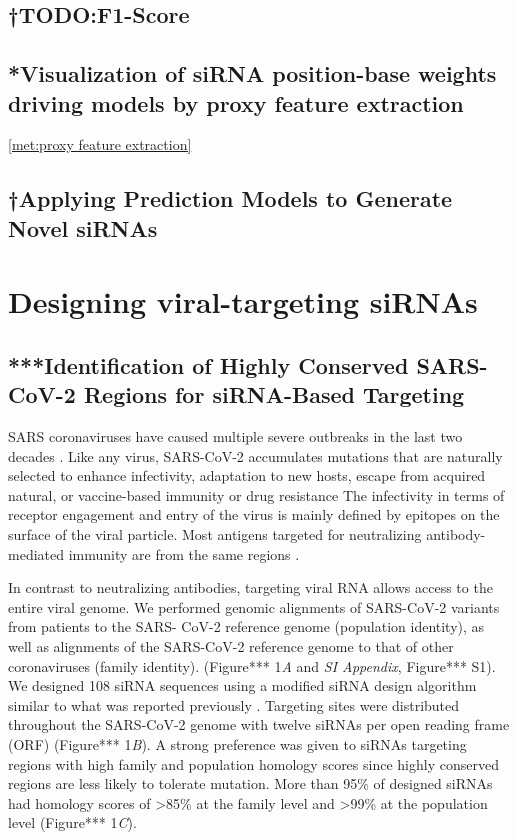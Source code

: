 \documentclass{report}
\begin{document}
\subsection{†TODO:F1-Score}\label{met:f1-score}
\subsection{*Visualization of siRNA position-base weights driving models by proxy feature extraction} \ref{met:proxy feature extraction}
\subsection{†Applying Prediction Models to Generate Novel siRNAs}

\section{Designing viral-targeting siRNAs}\label{met:viral siRNA design}
\subsection{***Identification of Highly Conserved SARS-CoV-2 Regions for siRNA-Based Targeting}
SARS coronaviruses have caused multiple severe outbreaks in the last two decades \cite{piret_pandemics_2021, graham_decade_2013}. Like any virus, SARS-CoV-2 accumulates mutations that are naturally selected to enhance infectivity, adaptation to new hosts, escape from acquired natural, or vaccine-based immunity or drug resistance \cite{chakraborty_evolution_nodate, harvey_sars-cov-2_2021} The infectivity in terms of receptor engagement and entry of the virus is mainly defined by epitopes on the surface of the viral particle. Most antigens targeted for neutralizing antibody-mediated immunity are from the same regions \cite{lauring_genetic_2021, kannan_omicron_2022, hoffmann_sars-cov-2_2021, garcia-beltran_multiple_2021}. 

In contrast to neutralizing antibodies, targeting viral RNA allows access to the entire viral genome. We performed genomic alignments of SARS-CoV-2 variants from patients to the SARS- CoV-2 reference genome (population identity), as well as alignments of the SARS-CoV-2 reference genome to that of other coronaviruses (family identity). (Figure*** 1\textit{A }and \textit{SI Appendix}, Figure*** S1). We designed 108 siRNA sequences using a modified siRNA design algorithm similar to what was reported previously \cite{shmushkovich_functional_2018}. Targeting sites were distributed throughout the SARS-CoV-2 genome with twelve siRNAs per open reading frame (ORF) (Figure*** 1\textit{B}). A strong preference was given to siRNAs targeting regions with high family and population homology scores since highly conserved regions are less likely to tolerate mutation. More than 95\% of designed siRNAs had homology scores of >85\% at the family level and >99\% at the population level (Figure*** 1\textit{C}). 
\end{document}
